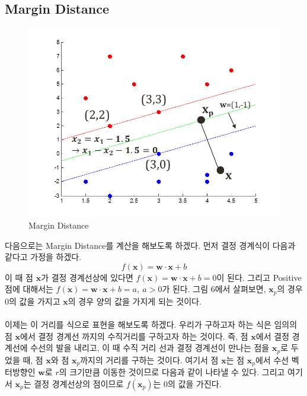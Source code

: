 \documentclass[a4paper]{oblivoir}
\begin{document}
\subsection{Margin Distance}
\begin{figure}[ht]\centering
\includegraphics[scale=0.7]{Margin_Distance}\caption{Margin Distance}\label{Fig:5-6}
\end{figure}
\indent 다음으로는 Margin Distance를 계산을 해보도록 하겠다. 먼저 결정 경계식이 다음과 같다고 가정을 하겠다.
\begin{equation}
f(\mathbf{x})=\mathbf{w\cdot x}+b
\label{eq:5-8}
\end{equation}
이 때 점 $\mathbf{x}$가 결정 경계선상에 있다면 $f(\mathbf{x})=\mathbf{w\cdot x}+b=0$이 된다. 그리고 Positive 점에 대해서는 
$f(\mathbf{x})=\mathbf{w\cdot x}+b=a,\ a>0$가 된다. 그림 6에서 살펴보면, $\mathbf{x}_p$의 경우 0의 값을 가지고 $\mathbf{x}$의 경우 양의 값을 가지게 되는 것이다.\\\\
\indent 이제는 이 거리를 식으로 표현을 해보도록 하겠다. 우리가 구하고자 하는 식은 임의의 점 $\mathbf{x}$에서 결정 경계선 까지의 수직거리를 구하고자 하는 것이다. 즉, 점 $\mathbf{x}$에서 결정 경계선에 수선의 발을 내리고, 이 때 수직 거리 선과 결정 경계선이 만나는 점을 $\mathbf{x}_p$로 두었을 때, 점 $\mathbf{x}$와 점 $\mathbf{x}_p$까지의 거리를 구하는 것이다. 여기서 점 $\mathbf{x}$는 점 $\mathbf{x}_p$에서 수선 벡터방향인 $\mathbf{w}$로 $r$의 크기만큼 이동한 것이므로 다음과 같이 나타낼 수 있다. 그리고 여기서 $\mathbf{x}_p$는 결정 경계선상의 점이므로 $f(\mathbf{x}_p)$는 0의 값을 가진다.\\
\end{document}
